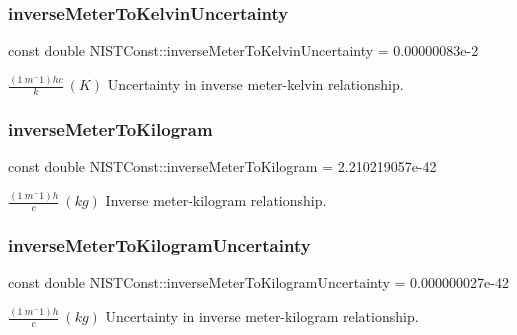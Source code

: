\subsubsection{\texorpdfstring{inverse\+Meter\+To\+Kelvin\+Uncertainty}{inverseMeterToKelvinUncertainty}}
{\footnotesize\ttfamily const double N\+I\+S\+T\+Const\+::inverse\+Meter\+To\+Kelvin\+Uncertainty = 0.\+00000083e-\/2}

$\frac{(1\ m^-1)hc}{k} \ (K)$ Uncertainty in inverse meter-\/kelvin relationship. \mbox{\label{group___inverse_meter_ga6b5807b2161fa29684e4862e575b9102}} 
\subsubsection{\texorpdfstring{inverse\+Meter\+To\+Kilogram}{inverseMeterToKilogram}}
{\footnotesize\ttfamily const double N\+I\+S\+T\+Const\+::inverse\+Meter\+To\+Kilogram = 2.\+210219057e-\/42}

$\frac{(1\ m^-1)h}{c} \ (kg)$ Inverse meter-\/kilogram relationship. \mbox{\label{group___inverse_meter_gaedbe76575234cd5252d6a4b2ef8db104}} 
\subsubsection{\texorpdfstring{inverse\+Meter\+To\+Kilogram\+Uncertainty}{inverseMeterToKilogramUncertainty}}
{\footnotesize\ttfamily const double N\+I\+S\+T\+Const\+::inverse\+Meter\+To\+Kilogram\+Uncertainty = 0.\+000000027e-\/42}

$\frac{(1\ m^-1)h}{c} \ (kg)$ Uncertainty in inverse meter-\/kilogram relationship. 